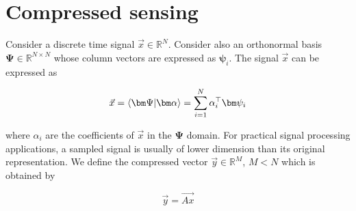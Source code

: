 \section{Compressed sensing}
\label{sec:cs}

Consider a discrete time signal $\vec{x} \in \mathbb{R}^N$. Consider also an orthonormal basis $\bm\Psi \in \mathbb{R}^{N \times N}$ whose column vectors are expressed as $\bm\psi_i$. The signal $\vec{x}$ can be expressed as

\begin{equation}\label{eq:signal-transform}
	\vec{x} = \innerproduct{\bm\Psi}{\bm\alpha} = \sum_{i=1}^N \alpha_i^\top \bm\psi_i
\end{equation}

\noindent where $\alpha_i$ are the coefficients of $\vec{x}$ in the $\bm\Psi$ domain. For practical signal processing applications, a sampled signal is usually of lower dimension than its original representation. We define the compressed vector $\vec{y} \in \mathbb{R}^M$, $M < N$ which is obtained by

\begin{equation}\label{eq:cesa}
	\vec{y} = \vec{Ax}
\end{equation}

